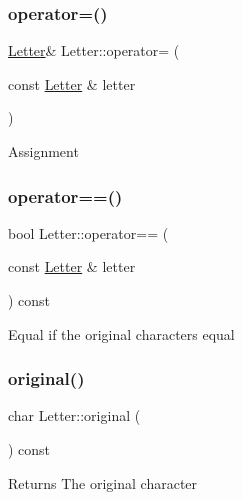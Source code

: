 \subsubsection{\texorpdfstring{operator=()}{operator=()}}
{\footnotesize\ttfamily \hyperlink{class_letter}{Letter}\& Letter\+::operator= (\begin{DoxyParamCaption}\item[{const \hyperlink{class_letter}{Letter} \&}]{letter }\end{DoxyParamCaption})\hspace{0.3cm}{\ttfamily [inline]}}

Assignment \mbox{\label{class_letter_a5ed233b62c83d0a84cd40a42b9a90657}} 
\subsubsection{\texorpdfstring{operator==()}{operator==()}}
{\footnotesize\ttfamily bool Letter\+::operator== (\begin{DoxyParamCaption}\item[{const \hyperlink{class_letter}{Letter} \&}]{letter }\end{DoxyParamCaption}) const\hspace{0.3cm}{\ttfamily [inline]}}

Equal if the original characters equal \mbox{\label{class_letter_a9ae0471d69dddf53a0a64219233d0c4a}} 
\subsubsection{\texorpdfstring{original()}{original()}\hspace{0.1cm}{\footnotesize\ttfamily [1/2]}}
{\footnotesize\ttfamily char Letter\+::original (\begin{DoxyParamCaption}{ }\end{DoxyParamCaption}) const\hspace{0.3cm}{\ttfamily [inline]}}

\begin{DoxyReturn}{Returns}
The original character 
\end{DoxyReturn}
\mbox{\label{class_letter_af6158c9bc58d3f4b77ee627807b87133}} 
